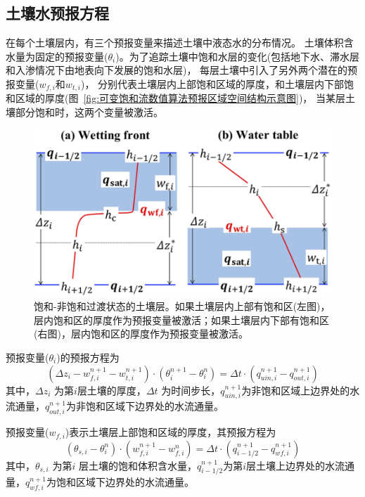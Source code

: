 \subsection{土壤水预报方程}
在每个土壤层内，有三个预报变量来描述土壤中液态水的分布情况。
土壤体积含水量为固定的预报变量($\theta_i$)。为了追踪土壤中饱和水层的变化(包括地下水、滞水层和入渗情况下由地表向下发展的饱和水层)，
每层土壤中引入了另外两个潜在的预报变量($w_{f,i}$和$w_{t,i}$)，
分别代表土壤层内上部饱和区域的厚度，和土壤层内下部饱和区域的厚度(图~\ref{fig:可变饱和流数值算法预报区域空间结构示意图})，
当某层土壤部分饱和时，这两个变量被激活。
{
\begin{figure}[htbp]
\centering
\includegraphics{Figures/陆地表面的水分循环/饱和-非饱和过渡状态的土壤层.png}
\caption{饱和-非饱和过渡状态的土壤层。如果土壤层内上部有饱和区(左图)，
层内饱和区的厚度作为预报变量被激活；如果土壤层内下部有饱和区(右图)，层内饱和区的厚度作为预报变量被激活。}
\label{fig:饱和-非饱和过渡状态的土壤层}
\end{figure}
}


预报变量($\theta_i$)的预报方程为
\begin{equation}\label{si_in1}
\left(\Delta z_{i}-w_{f, i}^{n+1}-w_{t, i}^{n+1}\right) \cdot\left(\theta_{i}^{n+1}-\theta_{i}^{n}\right)=\Delta t \cdot\left(q_{ {uin,i }}^{n+1}-q_{ {out }, i}^{n+1}\right)
\end{equation}
其中，$\Delta z_i$ 为第$ i $层土壤的厚度，$\Delta t$ 为时间步长，$q_{uin,i}^{n+1}$为非饱和区域上边界处的水流通量，$q_{out,i}^{n+1}$为非饱和区域下边界处的水流通量。


预报变量($w_{f,i}$)表示土壤层上部饱和区域的厚度，其预报方程为
\begin{equation}\label{si_in2}
\left(\theta_{s, i}-\theta_{i}^{n}\right) \cdot\left(w_{f, i}^{n+1}-w_{f, i}^{n}\right)=\Delta t \cdot\left(q_{i-1/2}^{n+1}-q_{w f, i}^{n+1}\right)
\end{equation}
其中，$\theta_{s,i}$ 为第$ i$ 层土壤的饱和体积含水量，$ q_{{i-1/2}}^{n+1}$为第$i$层土壤上边界处的水流通量，$q_{wf,i}^{n+1}$为饱和区域下边界处的水流通量。


